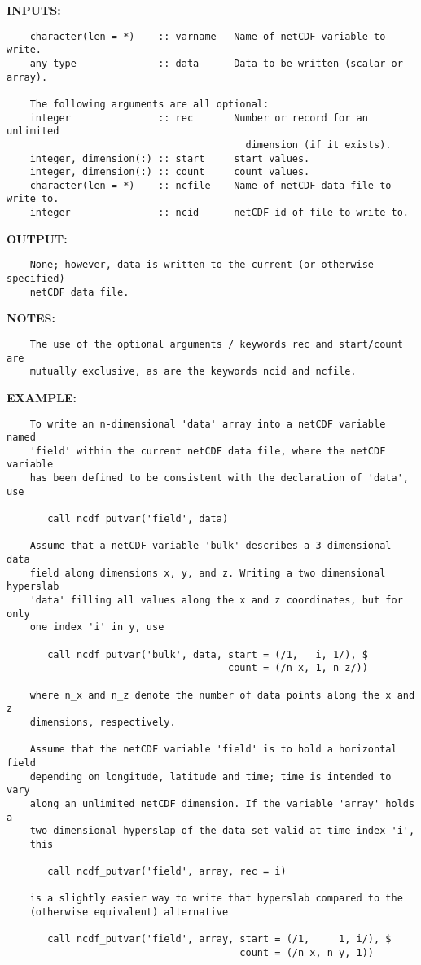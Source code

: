 \textbf{INPUTS:}\hspace{0.08in}\begin{Verbatim}
    character(len = *)    :: varname   Name of netCDF variable to write.
    any type              :: data      Data to be written (scalar or array).

    The following arguments are all optional:
    integer               :: rec       Number or record for an unlimited
                                         dimension (if it exists).
    integer, dimension(:) :: start     start values.
    integer, dimension(:) :: count     count values.
    character(len = *)    :: ncfile    Name of netCDF data file to write to.
    integer               :: ncid      netCDF id of file to write to.
\end{Verbatim}
\textbf{OUTPUT:}\hspace{0.08in}\begin{Verbatim}
    None; however, data is written to the current (or otherwise specified)
    netCDF data file.
\end{Verbatim}
\textbf{NOTES:}\hspace{0.08in}\begin{Verbatim}
    The use of the optional arguments / keywords rec and start/count are
    mutually exclusive, as are the keywords ncid and ncfile.
\end{Verbatim}
\textbf{EXAMPLE:}\hspace{0.08in}\begin{Verbatim}
    To write an n-dimensional 'data' array into a netCDF variable named
    'field' within the current netCDF data file, where the netCDF variable
    has been defined to be consistent with the declaration of 'data', use

       call ncdf_putvar('field', data)

    Assume that a netCDF variable 'bulk' describes a 3 dimensional data
    field along dimensions x, y, and z. Writing a two dimensional hyperslab
    'data' filling all values along the x and z coordinates, but for only
    one index 'i' in y, use

       call ncdf_putvar('bulk', data, start = (/1,   i, 1/), $
                                      count = (/n_x, 1, n_z/))

    where n_x and n_z denote the number of data points along the x and z
    dimensions, respectively.

    Assume that the netCDF variable 'field' is to hold a horizontal field
    depending on longitude, latitude and time; time is intended to vary
    along an unlimited netCDF dimension. If the variable 'array' holds a
    two-dimensional hyperslap of the data set valid at time index 'i',
    this

       call ncdf_putvar('field', array, rec = i)

    is a slightly easier way to write that hyperslab compared to the
    (otherwise equivalent) alternative

       call ncdf_putvar('field', array, start = (/1,     1, i/), $
                                        count = (/n_x, n_y, 1))
\end{Verbatim}
